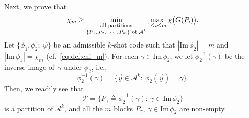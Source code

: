 \documentclass[11pt,draftclsnofoot,onecolumn]{IEEEtran}
\def\Im{\mathrm{Im}}
\begin{document}
 Next, we prove that
 \begin{equation*}
\chi_m\geq\min_{\substack{\text{ \rm{all partitions} }\\\text{$\{P_1,P_2,\cdots,P_m\}$ \rm{of} $\mathcal{A}^{k}$}}}\max_{1\leq i\leq m}\chi\big(G(P_i)\big).
\end{equation*}
Let  $\big\{\phi_1,\phi_2;~\psi\big\}$ be an admissible $k$-shot  code such that $|\Im\,\phi_2|=m$ and $|\Im\,\phi_{1}|=\chi_m$ (cf.~\eqref{eq:def:chi_m}).
 For each $\gamma\in\Im\,\phi_{2}$, we let $\phi_{2}^{-1}(\gamma)$ be  the inverse
image of~$\gamma$ under $\phi_{2}$, i.e.,
\begin{equation*}
\phi_{2}^{-1}(\gamma)=\big\{\vec{y}\in\mathcal{A}^{k}:~\phi_{2}(\vec{y})=\gamma\big\}.
\end{equation*}
 Then, we readily see that
 \begin{equation}
 \mathcal{P}=\big\{P_{\gamma}\triangleq\phi_{2}^{-1}(\gamma):~\gamma\in\Im\,\phi_{2}\big\}\label{pf-pro1-eq-00}
  \end{equation}
  is a  partition of $\mathcal{A}^{k}$, and  all the $m$ blocks $P_{\gamma},~\gamma\in\Im\,\phi_{2}$ are non-empty.
\end{document}
